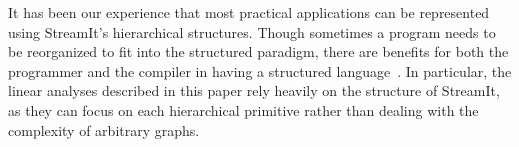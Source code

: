 It has been our experience that most practical applications can be
represented using StreamIt's hierarchical structures.  Though
sometimes a program needs to be reorganized to fit into the structured
paradigm, there are benefits for both the programmer and the compiler
in having a structured language~\cite{streamitcc}.  In particular, the
linear analyses described in this paper rely heavily on the structure
of StreamIt, as they can focus on each hierarchical primitive rather
than dealing with the complexity of arbitrary graphs.
